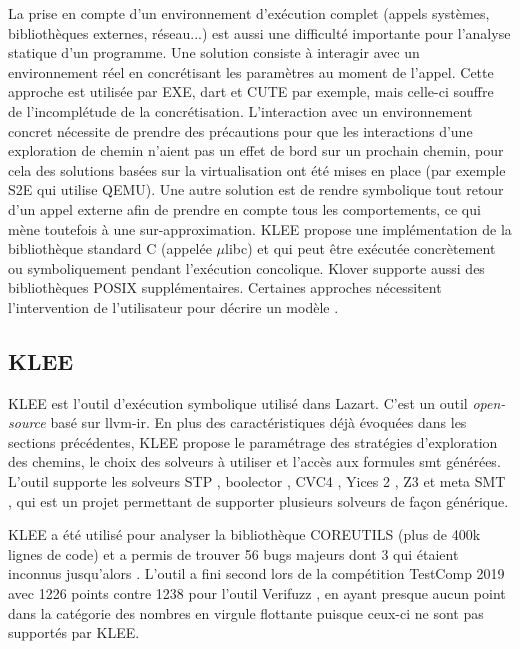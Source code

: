                 La prise en compte d'un environnement d'exécution complet (appels systèmes, bibliothèques externes, réseau...) est aussi une difficulté importante pour l'analyse statique d'un programme.
                Une solution consiste à interagir avec un environnement réel en concrétisant les paramètres au moment de l'appel. Cette approche est utilisée par EXE, \gls{dart} et CUTE par exemple, mais celle-ci souffre de l'incomplétude de la concrétisation.
                L'interaction avec un environnement concret nécessite de prendre des précautions pour que les interactions d'une exploration de chemin n'aient pas un effet de bord sur un prochain chemin, pour cela des solutions basées sur la virtualisation ont été mises en place (par exemple S2E \cite{chipounov2012s2e} qui utilise QEMU).
                Une autre solution est de rendre symbolique tout retour d'un appel externe afin de prendre en compte tous les comportements, ce qui mène toutefois à une sur-approximation.
                KLEE propose une implémentation de la bibliothèque standard C (appelée $\mu$libc) et qui peut être exécutée concrètement ou symboliquement pendant l'exécution concolique. Klover \cite{li2011klover} supporte aussi des bibliothèques POSIX supplémentaires.
                Certaines approches nécessitent l'intervention de l'utilisateur pour décrire un modèle \cite{xiao2011precise}. 

        \subsection{KLEE}
        \label{sec:klee}
        
            KLEE \cite{Cadar/OSDI08} est l'outil d'exécution symbolique utilisé dans Lazart. C'est un outil \emph{open-source} \cite{Klee/github} basé sur llvm-ir. En plus des caractéristiques déjà évoquées dans les sections précédentes, KLEE propose le paramétrage des stratégies d'exploration des chemins, le choix des solveurs à utiliser et l'accès aux formules \gls{smt} générées. L'outil supporte les solveurs STP \cite{ganesh2007decision}, boolector \cite{brummayer2009boolector}, CVC4 \cite{BarrettCDHJKRT11}, Yices 2  \cite{dutertre2014yices}, Z3  \cite{DeMoura/ACM11} et meta SMT \cite{haedicke2011metasmt}, qui est un projet permettant de supporter plusieurs solveurs de façon générique. 
            
            KLEE a été utilisé pour analyser la bibliothèque COREUTILS \cite{Coreutils} (plus de 400k lignes de code) et a permis de trouver 56 bugs majeurs dont 3 qui étaient inconnus jusqu'alors \cite{Cadar/OSDI08}. 
            L'outil a fini second lors de la compétition TestComp 2019 \cite{cadar2020klee} avec 1226 points contre 1238 pour l'outil Verifuzz \cite{basak2019verifuzz}, en ayant presque aucun point dans la catégorie des nombres en virgule flottante puisque ceux-ci ne sont pas supportés par KLEE.
            
